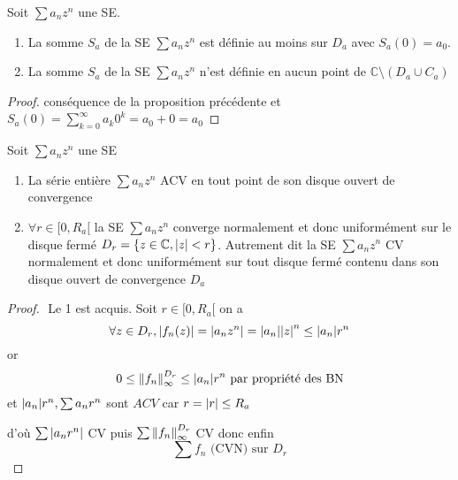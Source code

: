 \documentclass[11pt,hidelinks]{book}
\theoremstyle{mytheoremstyle}
\theoremstyle{mytheoremstyle}
\theoremstyle{mytheoremstyle}
\theoremstyle{mytheoremstyle}
\theoremstyle{mytheoremstyle}
\theoremstyle{mytheoremstyle}
\theoremstyle{mytheoremstyle}
\theoremstyle{mytheoremstyle}
\theoremstyle{myproblemstyle}
\def\mbb#1{\mathbb{#1}}
\def\bC{\mbb{C}}
\def\se{\sum a_n z^n}
\begin{document}
\begin{adjustwidth}{-2em}{-1em}
    \begin{prop}
        Soit $\se$ une SE.
        \begin{enumerate} 
        \item La somme $S_a$ de la SE $\se$ est définie au moins sur $D_a$ avec $S_a(0) = a_0$.
        \item La somme $S_a$ de la SE $\se$ n'est définie en aucun point de $\bC \setminus (D_a \cup C_a)$
        \end{enumerate}
        \begin{proof}
            conséquence de la proposition précédente et
            $S_a(0) = \sum_{k=0}^{\infty} a_k 0^k = a_0 + 0 = a_0$
        \end{proof}
    \end{prop}
    \begin{theorem}
        Soit $\se$ une SE 
        \begin{enumerate} 
        \item La série entière $\se$ ACV en tout point de son 
        disque ouvert de convergence 
        \item $\forall r \in [0,R_a[$ la SE $\se$ converge normalement et 
        donc uniformément sur le disque fermé $D_r = \{z \in \bC, \abs{z} < r\}$.
        Autrement dit la SE $\se$ CV normalement et donc uniformément sur tout 
        disque fermé contenu dans son disque ouvert de convergence $D_a$
        \end{enumerate}
        \begin{proof}$ $\newline
            Le 1 est acquis. \newline             
            Soit $r \in [0,R_a[$ on a 
            \begin{equation*}
            \forall z \in D_r, 
            \abs{f_n(z)} = \abs{a_n z^n} = \abs{a_n} \abs{z}^n \leq \abs{a_n} r^n
            \end{equation*}
            or 
            \begin{equation*}
                0 \leq \norm{f_n}^{D_r}_{\infty} \leq \abs{a_n} r^n \text{ par propriété des BN}
            \end{equation*}
            et $\abs{a_n}r^n, \sum a_n r^n$ sont $ACV$ car $r = \abs{r} \leq R_a$

            d'où $\sum \abs{a_n r^n}$ CV puis $\sum \norm{f_n}^{D_r}_{\infty}$ CV donc enfin
            \begin{equation*}
                \sum f_n  \text{ (CVN) sur } D_r
            \end{equation*}


\end{proof}
\end{theorem}
\end{adjustwidth}
\end{document}
